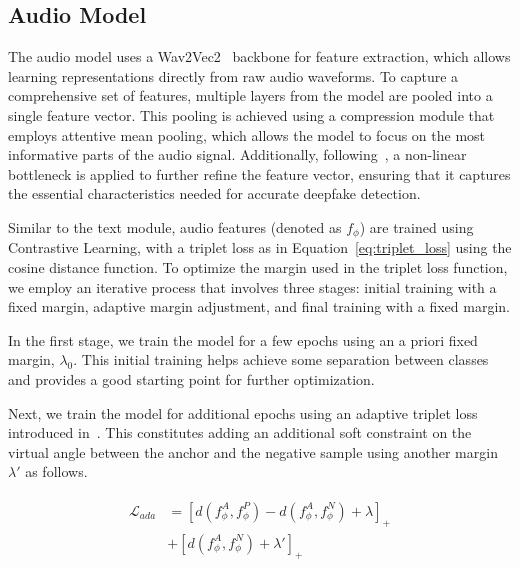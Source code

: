 \documentclass{Interspeech}
\begin{document}
\subsection{Audio Model}
\label{subsec:audio_model}
The audio model uses a Wav2Vec2~\cite{wav2vec2} backbone for feature
extraction, which allows learning representations directly from raw audio
waveforms. To capture a comprehensive set of features, multiple layers from the
model are pooled into a single feature vector. This pooling is achieved using a
compression module that employs attentive mean pooling, which allows the model
to focus on the most informative parts of the audio signal. Additionally,
following~\cite{slim}, a non-linear bottleneck is applied to further refine the
feature vector, ensuring that it captures the essential characteristics needed
for accurate deepfake detection.


Similar to the text module, audio features (denoted as $f_{\phi}$) are trained
using Contrastive Learning, with a triplet loss as in
Equation~\ref{eq:triplet_loss} using the cosine distance function. To optimize
the margin used in the triplet loss function, we employ an iterative process
that involves three stages: initial training with a fixed margin, adaptive
margin adjustment, and final training with a fixed margin.

In the first stage, we train the model for a few epochs using an a priori fixed
margin, $\lambda_0$. This initial training helps achieve some separation
between classes and provides a good starting point for further optimization.

Next, we train the model for additional epochs using an adaptive triplet loss
introduced in~\cite{adatriplet}. This constitutes adding an additional soft
constraint on the virtual angle between the anchor and the negative sample
using another margin $\lambda'$ as follows.

\begin{align}
  \begin{split}
    \mathcal{L}_{ada} & = [d(f_\phi^{A},f_\phi^{P}) - d(f_\phi^{A},f_\phi^{N})+ \lambda]_{+} \\
                      & + [d(f_\phi^{A},f_\phi^{N}) + \lambda']_{+}
  \end{split}
\end{align}
\end{document}
